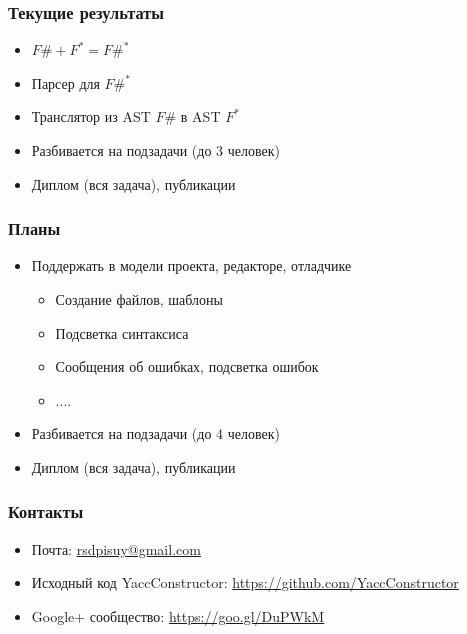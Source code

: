 \documentclass{beamer}
\begin{document}
\begin{frame}
  \transwipe[direction=90]
  \frametitle{Текущие результаты}
  \begin{itemize}
    \item $F\# + F^* = F\#^*$
    \item Парсер для $F\#^*$
    \item Транслятор из AST $F\#$ в AST $F^*$
    \item Разбивается на подзадачи (до 3 человек)
    \item Диплом (вся задача), публикации
  \end{itemize}
\end{frame}

\begin{frame}
  \transwipe[direction=90]
  \frametitle{Планы}
  \begin{itemize}
    \item Поддержать в модели проекта, редакторе, отладчике
      \begin{itemize}
        \item Создание файлов, шаблоны
        \item Подсветка синтаксиса
        \item Сообщения об ошибках, подсветка ошибок
        \item ....
      \end{itemize}
    \item Разбивается на подзадачи (до 4 человек)
    \item Диплом (вся задача), публикации
  \end{itemize}
\end{frame}
          
\begin{frame}
\transwipe[direction=90]
\frametitle{Контакты}
\begin{itemize}
  \item Почта: \url{rsdpisuy@gmail.com}
  \item Исходный код YaccConstructor: \url{https://github.com/YaccConstructor}
  \item Google+ сообщество: \url{https://goo.gl/DuPWkM}
\end{itemize}
\end{frame}
\end{document}
